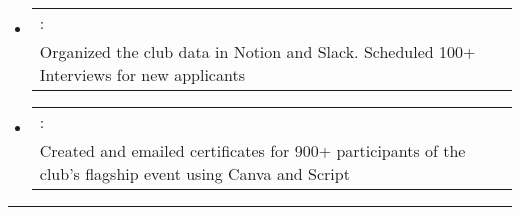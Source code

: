 \documentclass[a4paper,11pt]{article}
\makeatletter
\newcommand{\resumePOR}[3]{
\vspace{0.5mm}\item[]
    \begin{tabular*}{\textwidth}[t]{l@{\extracolsep{\fill}}r}
    \hspace{-3mm}{#1}:\hspace{1mm} & \hspace*{0pt}\hfill{\footnotesize{ #3}} \vspace{-0.5mm}\\ \hspace{-2.9mm}#2 
    \end{tabular*}
    \vspace{0mm}
}
\newcommand{\resumeSubHeadingListStart}{\begin{itemize}[leftmargin=*,labelsep=0mm,itemsep=-2.5mm]}
\newcommand{\resumeSubHeadingListEnd}{\end{itemize}\vspace{-2mm}}
\makeatother
\begin{document}
\resumeSubHeadingListStart
\resumePOR{\textbf{Sr. Data Manager, Association of Computer Engineering Students, DIT}} %
{Organized the club data in Notion and Slack. Scheduled 100+ Interviews for new applicants}{\raisebox{0.75pt}{2023 - 2024}}
\vspace{0.5mm}
\resumePOR{\textbf{Jr. Technical Head, Association of Computer Engineering Students, DIT}}
{Created and emailed certificates for 900+ participants of the club's flagship event using Canva and \Apps Script}
{\raisebox{0.75pt}{2022 - 2023}}
\vspace{-1mm}
\resumeSubHeadingListEnd
\hspace*{-2mm}\rule{1.030\textwidth}{0.1mm}
\vspace{0mm}

\end{document}
